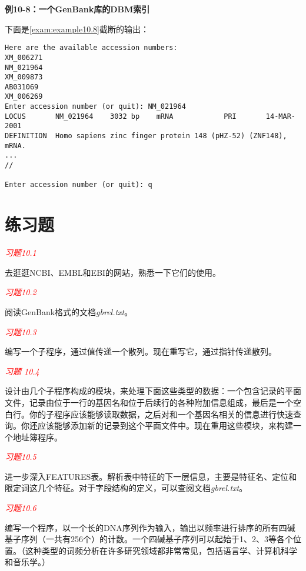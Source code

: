 \textbf{例10-8：一个GenBank库的DBM索引}


下面是\autoref{exam:example10.8}截断的输出：

\begin{lstlisting}
Here are the available accession numbers:
XM_006271
NM_021964
XM_009873
AB031069
XM_006269
Enter accession number (or quit): NM_021964
LOCUS       NM_021964    3032 bp    mRNA            PRI       14-MAR-2001
DEFINITION  Homo sapiens zinc finger protein 148 (pHZ-52) (ZNF148), mRNA.
...
//

Enter accession number (or quit): q
\end{lstlisting}

\section{练习题}
\textcolor{red}{\textit{习题10.1}}
\begin{adjustwidth}{1cm}{}
去逛逛NCBI、EMBL和EBI的网站，熟悉一下它们的使用。
\end{adjustwidth}

\textcolor{red}{\textit{习题10.2}}
\begin{adjustwidth}{1cm}{}
阅读GenBank格式的文档\textit{gbrel.txt}。
\end{adjustwidth}

\textcolor{red}{\textit{习题10.3}}
\begin{adjustwidth}{1cm}{}
编写一个子程序，通过值传递一个散列。现在重写它，通过指针传递散列。
\end{adjustwidth}

\textcolor{red}{\textit{习题 10.4}}
\begin{adjustwidth}{1cm}{}
设计由几个子程序构成的模块，来处理下面这些类型的数据：一个包含记录的平面文件，记录由位于一行的基因名和位于后续行的各种附加信息组成，最后是一个空白行。你的子程序应该能够读取数据，之后对和一个基因名相关的信息进行快速查询。你还应该能够添加新的记录到这个平面文件中。现在重用这些模块，来构建一个地址簿程序。
\end{adjustwidth}

\textcolor{red}{\textit{习题10.5}}
\begin{adjustwidth}{1cm}{}
进一步深入FEATURES表。解析表中特征的下一层信息，主要是特征名、定位和限定词这几个特征。对于字段结构的定义，可以查阅文档\textit{gbrel.txt}。
\end{adjustwidth}

\textcolor{red}{\textit{习题10.6}}
\begin{adjustwidth}{1cm}{}
编写一个程序，以一个长的DNA序列作为输入，输出以频率进行排序的所有四碱基子序列（一共有256个）的计数。一个四碱基子序列可以起始于1、2、3等各个位置。（这种类型的词频分析在许多研究领域都非常常见，包括语言学、计算机科学和音乐学。）
\end{adjustwidth}

